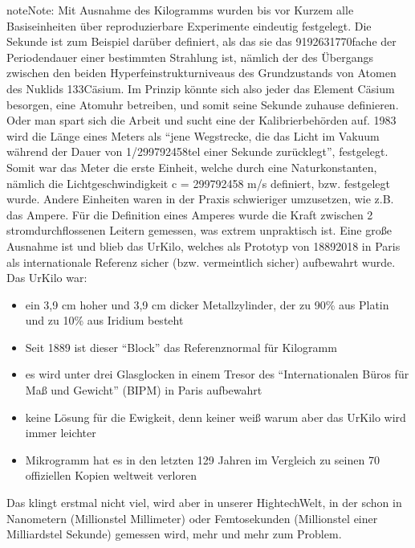 \documentclass[letterpaper,10pt,english]{jupyterBook}
\begin{document}
\begin{sphinxadmonition}{note}{Note:}
\sphinxAtStartPar
Mit Ausnahme des Kilogramms wurden bis vor Kurzem alle Basiseinheiten über reproduzierbare Experimente eindeutig festgelegt. Die Sekunde ist zum Beispiel darüber definiert, als das sie das 9192631770\sphinxhyphen{}fache der Periodendauer einer bestimmten Strahlung ist, nämlich der des Übergangs zwischen den beiden Hyperfeinstrukturniveaus des Grundzustands von Atomen des Nuklids 133\sphinxhyphen{}Cäsium. Im Prinzip könnte sich also jeder das Element Cäsium besorgen, eine Atomuhr betreiben, und somit seine Sekunde zuhause definieren. Oder man spart sich die Arbeit und sucht eine der Kalibrierbehörden auf.
1983 wird die Länge eines Meters als “jene Wegstrecke, die das Licht im Vakuum während der Dauer von 1/299792458\sphinxhyphen{}tel einer Sekunde zurücklegt”, festgelegt. Somit war das Meter die erste Einheit, welche durch eine Naturkonstanten, nämlich die Lichtgeschwindigkeit c = 299792458 m/s definiert, bzw. festgelegt wurde. Andere Einheiten waren in der Praxis schwieriger umzusetzen, wie z.B. das Ampere. Für die Definition eines Amperes wurde die Kraft zwischen 2 stromdurchflossenen Leitern gemessen, was extrem unpraktisch ist.
Eine große Ausnahme ist und blieb das Ur\sphinxhyphen{}Kilo, welches als Prototyp von 1889\sphinxhyphen{}2018 in Paris als internationale Referenz sicher (bzw. vermeintlich sicher) aufbewahrt wurde. Das Ur\sphinxhyphen{}Kilo war:
\begin{itemize}
\item {} 
\sphinxAtStartPar
ein 3,9 cm hoher und 3,9 cm dicker Metallzylinder, der zu 90\% aus Platin und zu 10\% aus Iridium besteht

\item {} 
\sphinxAtStartPar
Seit 1889 ist dieser “Block” das Referenznormal für Kilogramm

\item {} 
\sphinxAtStartPar
es wird unter drei Glasglocken in einem Tresor des “Internationalen Büros für Maß und Gewicht” (BIPM) in Paris aufbewahrt

\item {} 
\sphinxAtStartPar
keine Lösung für die Ewigkeit, denn \sphinxhyphen{} keiner weiß warum \sphinxhyphen{} aber das Ur\sphinxhyphen{}Kilo wird immer leichter

\item {} 
 Mikrogramm hat es in den letzten 129 Jahren im Vergleich zu seinen 70 offiziellen Kopien weltweit verloren

\end{itemize}

\sphinxAtStartPar
{}

\sphinxAtStartPar
Das klingt erstmal nicht viel, wird aber in unserer Hightech\sphinxhyphen{}Welt, in der schon in Nanometern (Millionstel Millimeter) oder Femtosekunden (Millionstel einer Milliardstel Sekunde) gemessen wird, mehr und mehr zum Problem.
\end{sphinxadmonition}
\end{document}
